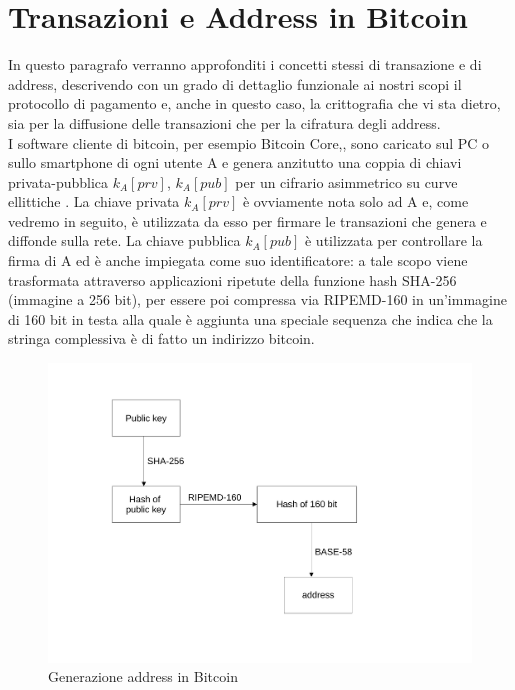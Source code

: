 \section{Transazioni e Address in Bitcoin}\label{Transazioni}
In questo  paragrafo verranno approfonditi i concetti stessi di transazione e di address, descrivendo con un grado di dettaglio funzionale ai nostri scopi il protocollo di pagamento e, anche in questo caso, la crittografia che vi sta dietro, sia per la diffusione delle transazioni che per la cifratura degli address.\\I software cliente di bitcoin, per esempio Bitcoin Core,, sono caricato sul PC o sullo smartphone di ogni utente A e genera anzitutto una coppia di chiavi privata-pubblica $k_A [prv]$, $k_A [pub]$ per un cifrario asimmetrico su curve ellittiche \cite{curve}. La
chiave privata $k_A [prv]$ è ovviamente nota solo ad A e, come vedremo in seguito, è utilizzata da esso per ﬁrmare le transazioni che genera e diﬀonde sulla rete. La chiave pubblica $k_A [pub]$ è utilizzata per controllare la ﬁrma di A ed è anche impiegata come suo identiﬁcatore: a tale scopo viene trasformata attraverso applicazioni ripetute della funzione hash SHA-256 (immagine a 256 bit), per essere poi compressa via RIPEMD-160 in un’immagine di 160 bit in testa alla quale è aggiunta una speciale sequenza che indica che la stringa complessiva è di fatto un indirizzo bitcoin.
\begin{figure}[h!]
    \centering
    \includegraphics[scale=0.5, trim = 1cm 2cm 0cm 2cm, clip]{Images/address_gen.pdf}
    \caption{Generazione address in Bitcoin}
    \label{fig:sha-256_address}
\end{figure}
